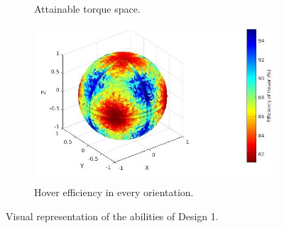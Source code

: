 \begin{figure}[!h]
{\begin{subfigure}[b]{0.5\textwidth}
    \caption{Attainable torque space.} \label{fig:deisgn1_tspace}
  \end{subfigure}
  \begin{subfigure}[b]{0.45\textwidth}
    \includegraphics[width=\linewidth]{images/Quad_design_2_hspace.jpg}
    \caption{Hover efficiency in every orientation.} \label{fig:deisgn1_hspace}
  \end{subfigure}}
  \caption{Visual representation of the abilities of Design 1.}
  \label{fig:Quadcopter1_spaces}
\end{figure}
